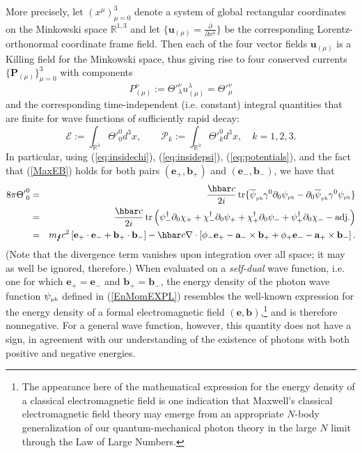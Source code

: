 \documentclass[12pt]{article}
\theoremstyle{definition}
\DeclareMathOperator{\tr}{tr}
\newcommand{\refeq}[1]{(\ref{#1})}
\numberwithin{equation}{section}
\newcommand{\bb}{\mathbf{b}}
\newcommand{\ba}{\mathbf{a}}
\newcommand{\be}{\mathbf{e}}
\newcommand{\bP}{\mathbf{P}}
\newcommand{\bu}{\mathbf{u}}
\newcommand{\beq}{\begin{equation}}
\newcommand{\eeq}{\end{equation}}
\newcommand{\p}{\partial}
\newcommand{\cE}{{\mathcal E}}
\newcommand{\cP}{{\mathcal P}}
\newcommand{\psiPH}{{\psi_{\mbox{\rm\tiny ph}}}}
\newcommand{\psiPHb}{{\overline\psi_{\mbox{\rm\tiny ph}}}}
\newcommand{\mPH}{{m_{\mbox{\Lightning}}}}
\newcommand{\Rset}{{\mathbb R}}
\newcommand{\la}{\lambda}
\newcommand{\ga}{\gamma}
\newcommand{\bna}{\begin{eqnarray}}
\newcommand{\ena}{\end{eqnarray}}
\begin{document}
More precisely, let $(x^\mu)_{\mu=0}^3$ denote a system of global rectangular coordinates on the Minkowski space $\Rset^{1,3}$ and 
let $\{ \bu_{(\mu)} = \frac{\p}{\p x^\mu} \}$ be the corresponding Lorentz-orthonormal coordinate frame field. 
 Then each of the four vector fields $\bu_{(\mu)}$ is a Killing field for the Minkowski space, thus giving rise to four conserved 
currents $\{\bP_{(\mu)}\}_{\mu=0}^3$ with components
\beq
P_{(\mu)}^\nu := \Theta'^\nu_\la u_{(\mu)}^\la = \Theta'^\nu_\mu
\eeq
and the corresponding time-independent (i.e. constant) integral quantities that are finite for wave functions of sufficiently rapid decay:
\beq\label{def:EnMom}
\cE := \int_{\Rset^3} {\Theta'}^0_0 d^3x,\qquad \cP_k := \int_{\Rset^3} {\Theta'}_k^0 d^3x,\quad k = 1,2,3.
\eeq
In particular, using \refeq{eq:insidechi}, \refeq{eq:insidepsi}, \refeq{eq:potentials}, and the fact that \refeq{MaxEB} holds for both 
pairs $(\be_+,\bb_+)$ and $(\be_-,\bb_-)$, we have that
\bna
8\pi {\Theta'}^0_0 & = & \frac{\hbar c}{2i} \tr \{ \psiPHb \ga^0\p_0 \psiPH - \p_0\psiPHb \ga^0 \psiPH \} \nonumber\\
& = & \frac{\hbar c}{2i} \tr\left( \psi_-^\dag \p_0 \chi_+ + \chi_-^\dag \p_0 \psi_+ + \chi_+^\dag \p_0 \psi_- 
+ \psi_+^\dag \p_0 \chi_- - \mbox{adj.}\right) \nonumber\\
& = & {\mPH c^2} \left[ \be_+\cdot \be_- + \bb_+ \cdot \bb_- \right] - 
{\hbar c } \nabla \cdot \left[ \phi_- \be_+ - \ba_- \times \bb_+ +\phi_+\be_- - \ba_+ \times \bb_- \right].
\label{EnMomEXPL}
\ena
 (Note that the divergence term vanishes upon integration over all space; it may as well be ignored, therefore.)
 When evaluated on a {\em self-dual} wave function, i.e. one for which $\be_+ = \be_-$ and $\bb_+ = \bb_-$, 
the energy density of the photon wave function $\psiPH$
defined in \refeq{EnMomEXPL} resembles the well-known expression for the energy density of 
a formal electromagnetic field $(\be,\bb)$,\footnote{The appearance here of the 
   mathematical expression for the energy density of a classical electromagnetic field is one indication that
   Maxwell's classical electromagnetic field theory may emerge from an appropriate $N$-body generalization of our 
   quantum-mechanical photon theory  in the large $N$ limit through the Law of Large Numbers.}
 and is therefore nonnegative.
 For a general wave function, however, this quantity does not have a sign, in agreement with our understanding of the existence 
of photons with both positive and negative energies.
\end{document}

